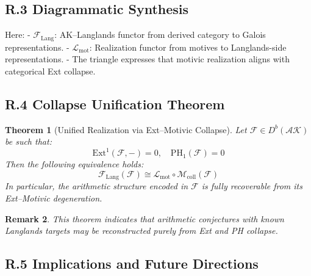 \documentclass[11pt]{article}
\newtheorem{theorem}{Theorem}[section]
\newtheorem{remark}[theorem]{Remark}
\begin{document}
\subsection*{R.3 Diagrammatic Synthesis}

\vspace{1em}
\begin{center}
\end{center}
\vspace{1em}

Here:
- \( \mathcal{F}_{\mathrm{Lang}} \): AK–Langlands functor from derived category to Galois representations.
- \( \mathcal{L}_{\mathrm{mot}} \): Realization functor from motives to Langlands-side representations.
- The triangle expresses that motivic realization aligns with categorical Ext collapse.

\subsection*{R.4 Collapse Unification Theorem}

\begin{theorem}[Unified Realization via Ext–Motivic Collapse]
Let \( \mathcal{F} \in D^b(\mathcal{AK}) \) be such that:
\[
\mathrm{Ext}^1(\mathcal{F}, -) = 0, \quad \mathrm{PH}_1(\mathcal{F}) = 0
\]
Then the following equivalence holds:
\[
\mathcal{F}_{\mathrm{Lang}}(\mathcal{F}) \cong \mathcal{L}_{\mathrm{mot}} \circ \mathcal{M}_{\mathrm{coll}}(\mathcal{F})
\]
In particular, the arithmetic structure encoded in \( \mathcal{F} \) is fully recoverable from its Ext–Motivic degeneration.
\end{theorem}

\begin{remark}
This theorem indicates that arithmetic conjectures with known Langlands targets may be reconstructed purely from Ext and PH collapse.
\end{remark}

\subsection*{R.5 Implications and Future Directions}
\end{document}
